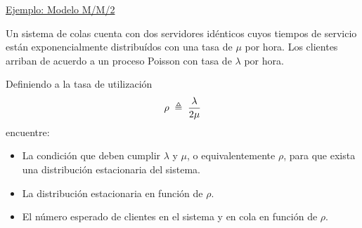 \documentclass[ 10pt, xcolor = dvipsnames]{beamer}
\begin{document}
\begin{frame}[allowframebreaks]
\frametitle{\insertsubsection}

\underline{Ejemplo: Modelo M/M/2}

Un sistema de colas cuenta con dos servidores id\'enticos cuyos tiempos de servicio est\'an exponencialmente distribu\'idos con una tasa de $\mu$ por hora. Los clientes arriban de acuerdo a un proceso Poisson con tasa de $\lambda$ por hora. 

Definiendo a la tasa de utilizaci\'on 
\[
\rho \; \triangleq \; \frac{\lambda}{2\mu}
\]
encuentre: 

\begin{itemize}
\item La condici\'on que deben cumplir $\lambda$ y $\mu$, o equivalentemente $\rho$, para que \linebreak exista una distribuci\'on estacionaria del sistema. 
\item La distribuci\'on estacionaria en funci\'on de $\rho$. 
\item El n\'umero esperado de clientes en el sistema y en cola en funci\'on de $\rho$. 
\end{itemize}

\end{frame}
\end{document}
